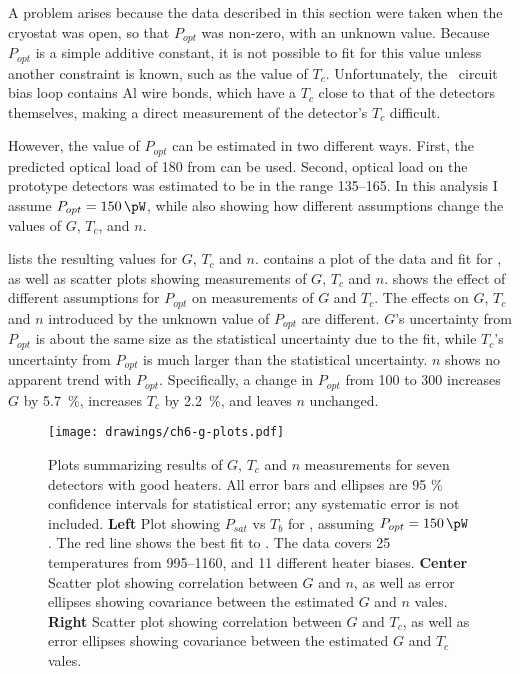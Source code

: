 A problem arises because the data described in this section were taken when the cryostat was open, so that $P_{opt}$ was non-zero, with an unknown value.
Because $P_{opt}$ is a simple additive constant, it is not possible to fit for this value unless another constraint is known, such as the value of $T_c$.
Unfortunately, the \TES\ circuit bias loop contains Al wire bonds, which have a $T_c$ close to that of the detectors themselves, making a direct measurement of the detector's $T_c$ difficult.

However, the value of $P_{opt}$ can be estimated in two different ways. 
First, the predicted optical load of \SI{180}{\pW} from  can be used.
Second, optical load on the prototype detectors was estimated to be in the range \SIrange{135}{165}{\pW}.
In this analysis I assume $P_{opt} = \SI{150}{\pW}$, while also showing how different assumptions change the values of  $G$, $T_c$, and $n$.

 lists the resulting values for $G$, $T_c$ and $n$.
 contains a plot of the data and fit for , as well as scatter plots showing measurements of $G$, $T_c$ and $n$.
 shows the effect of different assumptions for $P_{opt}$ on measurements of $G$ and $T_c$.
The effects on $G$, $T_c$ and $n$ introduced by the unknown value of $P_{opt}$ are different.
$G$'s uncertainty from $P_{opt}$ is about the same size as the statistical uncertainty due to the fit, while $T_c$'s uncertainty from $P_{opt}$ is much larger than the statistical uncertainty.
$n$ shows no apparent trend with $P_{opt}$.
Specifically, a change in $P_{opt}$ from \SI{100}{\pW} to \SI{300}{\pW} increases $G$ by \SI{5.7}{\percent}, increases $T_c$ by \SI{2.2}{\percent}, and leaves $n$ unchanged.

\begin{figure*}
\texttt{[image: drawings/ch6-g-plots.pdf]}
\caption[$G$, $T_c$, and $n$ measurements]{
Plots summarizing results of $G$, $T_c$ and $n$ measurements for seven detectors with good heaters.
All error bars and ellipses are 95 \% confidence intervals for statistical error; any systematic error is not included.
\textbf{Left} Plot showing $P_{sat}$ vs $T_b$ for , assuming $P_{opt} = \SI{150}{\pW}$.
The red line shows the best fit to .
The data covers 25 temperatures from \SIrange{995}{1160}{\mK}, and 11 different heater biases.
\textbf{Center} Scatter plot showing correlation between $G$ and $n$, as well as error ellipses showing covariance between the estimated $G$ and $n$ vales.
\textbf{Right} Scatter plot showing correlation between $G$ and $T_c$, as well as error ellipses showing covariance between the estimated $G$ and $T_c$ vales.
} 
\label{fig:heater-g-plots}
\end{figure*}

